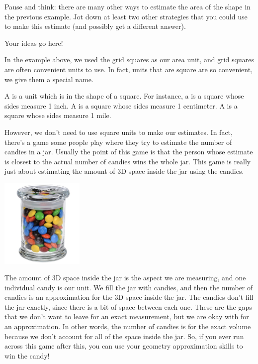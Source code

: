 \documentclass{ximera}
\begin{document}
\begin{question}
Pause and think: there are many other ways to estimate the area of the shape in the previous example. Jot down at least two other strategies that you could use to make this estimate (and possibly get a different answer).
\begin{freeResponse} Your ideas go here! \end{freeResponse}
\end{question}

In the example above, we used the grid squares as our area unit, and grid squares are often convenient units to use. In fact, units that are square are so convenient, we give them a special name.
\begin{definition}
A  is a unit which is in the shape of a square. For instance, a  is a square whose sides measure 1 inch. A  is a square whose sides measure 1 centimeter. A  is a square whose sides measure 1 mile.
\end{definition}
However, we don't need to use square units to make our estimates. In fact, there's a game some people play where they try to estimate the number of candies in a jar. Usually the point of this game is that the person whose estimate is closest to the actual number of candies wins the whole jar. This game is really just about estimating the amount of 3D space inside the jar using the candies. 
\begin{image}
\includegraphics[width=0.3\textwidth]{CandyJar.png}
\end{image}
The amount of 3D space inside the jar is the aspect we are measuring, and one individual candy is our unit. We fill the jar with candies, and then the number of candies is an approximation for the 3D space inside the jar. The candies don't fill the jar exactly, since there is a bit of space between each one. These are the gaps that we don't want to leave for an exact measurement, but we are okay with for an approximation. In other words, the number of candies is  for the exact volume because we don't account for all of the space inside the jar. So, if you ever run across this game after this, you can use your geometry approximation skills to win the candy!
\end{document}
